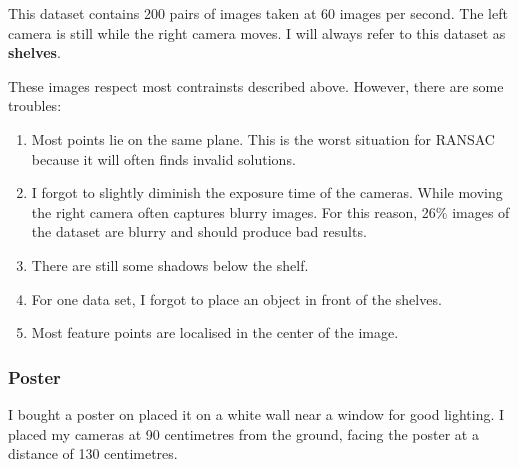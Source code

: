 \documentclass[11pt]{report}
\begin{document}
This dataset contains 200 pairs of images taken at 60 images per second. The left camera is still while the right camera moves. I will always refer to this dataset as \textbf{shelves}.

These images respect most contrainsts described above. However, there are some troubles:
\begin{enumerate}
    \item Most points lie on the same plane. This is the worst situation for RANSAC because it will often finds invalid solutions.
    \item I forgot to slightly diminish the exposure time of the cameras. While moving the right camera often captures blurry images. For this reason, 26\% images of the dataset are blurry and should produce bad results.
    \item There are still some shadows below the shelf.
    \item For one data set, I forgot to place an object in front of the shelves.
    \item Most feature points are localised in the center of the image.
\end{enumerate}

\subsubsection{Poster}

I bought a poster on placed it on a white wall near a window for good lighting. I placed my cameras at 90 centimetres from the ground, facing the poster at a distance of 130 centimetres.
\end{document}
